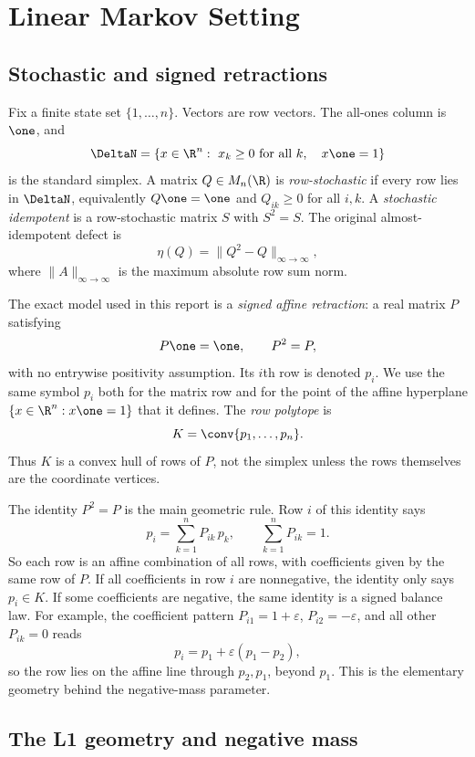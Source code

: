 \section{Linear Markov Setting}
\label{sec:linear-markov-setting}

\subsection{Stochastic and signed retractions}

Fix a finite state set \(\{1,\ldots,n\}\).  Vectors are row vectors.
The all-ones column is \(\one\), and
\[
  \DeltaN=\{x\in \R^n:\ x_k\ge 0\ \hbox{for all }k,\quad x\one=1\}
\]
is the standard simplex.  A matrix \(Q\in M_n(\R)\) is
\emph{row-stochastic} if every row lies in \(\DeltaN\), equivalently
\(Q\one=\one\) and \(Q_{ik}\ge 0\) for all \(i,k\).  A
\emph{stochastic idempotent} is a row-stochastic matrix \(S\) with
\(S^2=S\).  The original almost-idempotent defect is
\[
  \eta(Q)=\lVert Q^2-Q\rVert_{\infty\to\infty},
\]
where \(\lVert A\rVert_{\infty\to\infty}\) is the maximum absolute row
sum norm.

The exact model used in this report is a \emph{signed affine
retraction}: a real matrix \(P\) satisfying
\[
  P\one=\one,\qquad P^2=P,
\]
with no entrywise positivity assumption.  Its \(i\)th row is denoted
\(p_i\).  We use the same symbol \(p_i\) both for the matrix row and
for the point of the affine hyperplane \(\{x\in \R^n:x\one=1\}\) that
it defines.  The \emph{row polytope} is
\[
  K=\conv\{p_1,\ldots,p_n\}.
\]
Thus \(K\) is a convex hull of rows of \(P\), not the simplex unless
the rows themselves are the coordinate vertices.

The identity \(P^2=P\) is the main geometric rule.  Row \(i\) of this
identity says
\[
  p_i=\sum_{k=1}^n P_{ik}\,p_k,\qquad \sum_{k=1}^n P_{ik}=1.
\]
So each row is an affine combination of all rows, with coefficients
given by the same row of \(P\).  If all coefficients in row \(i\) are
nonnegative, the identity only says \(p_i\in K\).  If some coefficients
are negative, the same identity is a signed balance law.  For example,
the coefficient pattern \(P_{i1}=1+\varepsilon\),
\(P_{i2}=-\varepsilon\), and all other \(P_{ik}=0\) reads
\[
  p_i=p_1+\varepsilon(p_1-p_2),
\]
so the row lies on the affine line through \(p_2,p_1\), beyond \(p_1\).
This is the elementary geometry behind the negative-mass parameter.

\subsection{The L1 geometry and negative mass}

